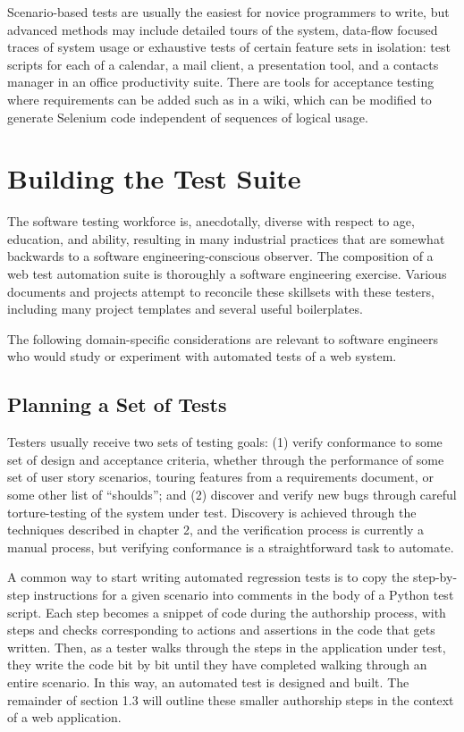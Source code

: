 Scenario-based tests are usually the easiest for novice programmers to write, but advanced methods may include detailed tours of the system, data-flow focused traces of system usage\citep{liu2000object} or exhaustive tests of certain feature sets in isolation: test scripts for each of a calendar, a mail client, a presentation tool, and a contacts manager in an office productivity suite. There are tools for acceptance testing where requirements can be added such as in a wiki, which can be modified to generate Selenium code independent of sequences of logical usage.\citep{wang2009build}

\section{Building the Test Suite}
The software testing workforce is, anecdotally, diverse with respect to age, education, and ability, resulting in many industrial practices that are somewhat backwards to a software engineering-conscious observer. The composition of a web test automation suite is thoroughly a software engineering exercise. Various documents and projects attempt to reconcile these skillsets with these testers, including many project templates and several useful boilerplates. \citep{GitHubma29}

The following domain-specific considerations are relevant to software engineers who would study or experiment with automated tests of a web system.

\subsection{Planning a Set of Tests}
Testers usually receive two sets of testing goals: (1) verify conformance to some set of design and acceptance criteria, whether through the performance of some set of user story scenarios, touring features from a requirements document, or some other list of ``shoulds''; and (2) discover and verify new bugs through careful torture-testing of the system under test. Discovery is achieved through the techniques described in chapter 2, and the verification process is currently a manual process, but verifying conformance is a straightforward task to automate.

A common way to start writing automated regression tests is to copy the step-by-step instructions for a given scenario into comments in the body of a Python test script. Each step becomes a snippet of code during the authorship process, with steps and checks corresponding to actions and assertions in the code that gets written. Then, as a tester walks through the steps in the application under test, they write the code bit by bit until they have completed walking through an entire scenario. In this way, an automated test is designed and built.\citep{nguyen2001testing} The remainder of section 1.3 will outline these smaller authorship steps in the context of a web application.

